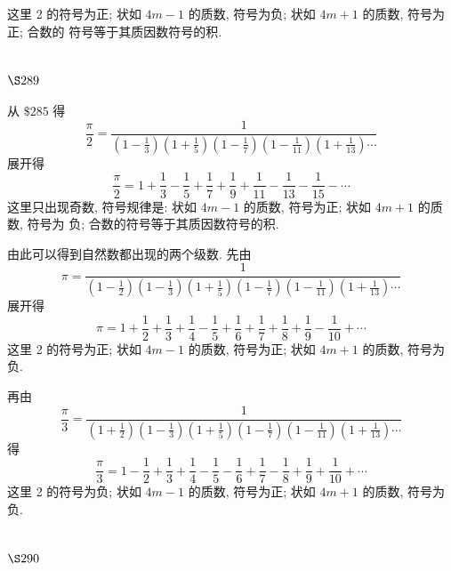 这里 2 的符号为正; 状如 $4 m-1$ 的质数, 符号为负; 状如 $4 m+1$ 的质数, 符号为正; 合数的 符号等于其质因数符号的积.

\section{$\S 289$}

从 $\$ 285$ 得
\[
\frac{\pi}{2}=\frac{1}{\left(1-\frac{1}{3}\right)\left(1+\frac{1}{5}\right)\left(1-\frac{1}{7}\right)\left(1-\frac{1}{11}\right)\left(1+\frac{1}{13}\right) \cdots}
\]
展开得
\[
\frac{\pi}{2}=1+\frac{1}{3}-\frac{1}{5}+\frac{1}{7}+\frac{1}{9}+\frac{1}{11}-\frac{1}{13}-\frac{1}{15}-\cdots
\]
这里只出现奇数, 符号规律是: 状如 $4 m-1$ 的质数, 符号为正; 状如 $4 m+1$ 的质数, 符号为 负; 合数的符号等于其质因数符号的积.

由此可以得到自然数都出现的两个级数. 先由
\[
\pi=\frac{1}{\left(1-\frac{1}{2}\right)\left(1-\frac{1}{3}\right)\left(1+\frac{1}{5}\right)\left(1-\frac{1}{7}\right)\left(1-\frac{1}{11}\right)\left(1+\frac{1}{13}\right) \cdots}
\]
展开得
\[
\pi=1+\frac{1}{2}+\frac{1}{3}+\frac{1}{4}-\frac{1}{5}+\frac{1}{6}+\frac{1}{7}+\frac{1}{8}+\frac{1}{9}-\frac{1}{10}+\cdots
\]
这里 2 的符号为正; 状如 $4 m-1$ 的质数, 符号为正; 状如 $4 m+1$ 的质数, 符号为负.

再由
\[
\frac{\pi}{3}=\frac{1}{\left(1+\frac{1}{2}\right)\left(1-\frac{1}{3}\right)\left(1+\frac{1}{5}\right)\left(1-\frac{1}{7}\right)\left(1-\frac{1}{11}\right)\left(1+\frac{1}{13}\right) \cdots}
\]
得
\[
\frac{\pi}{3}=1-\frac{1}{2}+\frac{1}{3}+\frac{1}{4}-\frac{1}{5}-\frac{1}{6}+\frac{1}{7}-\frac{1}{8}+\frac{1}{9}+\frac{1}{10}+\cdots
\]
这里 2 的符号为负; 状如 $4 m-1$ 的质数, 符号为正; 状如 $4 m+1$ 的质数, 符号为负.

\section{$\S 290$}

